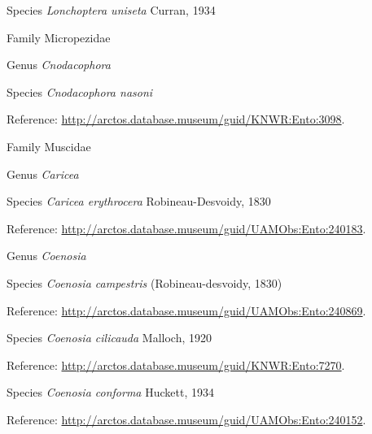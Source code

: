 \documentclass[9pt, article]{memoir}
\begin{document}
\begin{multicols}{2}
\vspace{6pt}\noindent\hspace{36pt}Species \textit{Lonchoptera uniseta} Curran, 1934


\vspace{6pt}\noindent\hspace{24pt}Family Micropezidae


\vspace{6pt}\noindent\hspace{30pt}Genus \textit{Cnodacophora}


\vspace{6pt}\noindent\hspace{36pt}Species \textit{Cnodacophora nasoni}


Reference: 
\url{http://arctos.database.museum/guid/KNWR:Ento:3098}.

\vspace{6pt}\noindent\hspace{24pt}Family Muscidae


\vspace{6pt}\noindent\hspace{30pt}Genus \textit{Caricea}


\vspace{6pt}\noindent\hspace{36pt}Species \textit{Caricea erythrocera} Robineau-Desvoidy, 1830


Reference: 
\url{http://arctos.database.museum/guid/UAMObs:Ento:240183}.

\vspace{6pt}\noindent\hspace{30pt}Genus \textit{Coenosia}


\vspace{6pt}\noindent\hspace{36pt}Species \textit{Coenosia campestris} (Robineau-desvoidy, 1830)


Reference: 
\url{http://arctos.database.museum/guid/UAMObs:Ento:240869}.

\vspace{6pt}\noindent\hspace{36pt}Species \textit{Coenosia cilicauda} Malloch, 1920


Reference: 
\url{http://arctos.database.museum/guid/KNWR:Ento:7270}.

\vspace{6pt}\noindent\hspace{36pt}Species \textit{Coenosia conforma} Huckett, 1934


Reference: 
\url{http://arctos.database.museum/guid/UAMObs:Ento:240152}.


\end{multicols}
\end{document}
